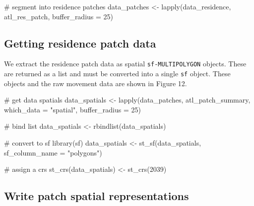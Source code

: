 \documentclass[]{scrreprt}
\newenvironment{Shaded}{}{}
\newcommand{\CommentTok}[1]{\textcolor[rgb]{0.00,0.50,0.00}{#1}}
\newcommand{\DataTypeTok}[1]{#1}
\newcommand{\DecValTok}[1]{#1}
\newcommand{\KeywordTok}[1]{\textcolor[rgb]{0.00,0.00,1.00}{#1}}
\newcommand{\NormalTok}[1]{#1}
\newcommand{\StringTok}[1]{\textcolor[rgb]{0.00,0.50,0.50}{#1}}
\begin{document}
\begin{Shaded}
\begin{Highlighting}[]
\CommentTok{# segment into residence patches}
\NormalTok{data_patches <-}\StringTok{ }\KeywordTok{lapply}\NormalTok{(data_residence, atl_res_patch,}
                       \DataTypeTok{buffer_radius =} \DecValTok{25}\NormalTok{)}
\end{Highlighting}
\end{Shaded}

\hypertarget{getting-residence-patch-data}{%
\subsection{Getting residence patch data}\label{getting-residence-patch-data}}

We extract the residence patch data as spatial \texttt{sf-MULTIPOLYGON} objects.
These are returned as a list and must be converted into a single \texttt{sf} object.
These objects and the raw movement data are shown in Figure 12.

\begin{Shaded}
\begin{Highlighting}[]
\CommentTok{# get data spatials}
\NormalTok{data_spatials <-}\StringTok{ }\KeywordTok{lapply}\NormalTok{(data_patches, atl_patch_summary,}
                        \DataTypeTok{which_data =} \StringTok{"spatial"}\NormalTok{,}
                        \DataTypeTok{buffer_radius =} \DecValTok{25}\NormalTok{)}

\CommentTok{# bind list}
\NormalTok{data_spatials <-}\StringTok{ }\KeywordTok{rbindlist}\NormalTok{(data_spatials)}

\CommentTok{# convert to sf}
\KeywordTok{library}\NormalTok{(sf)}
\NormalTok{data_spatials <-}\StringTok{ }\KeywordTok{st_sf}\NormalTok{(data_spatials, }\DataTypeTok{sf_column_name =} \StringTok{"polygons"}\NormalTok{)}

\CommentTok{# assign a crs}
\KeywordTok{st_crs}\NormalTok{(data_spatials) <-}\StringTok{ }\KeywordTok{st_crs}\NormalTok{(}\DecValTok{2039}\NormalTok{)}
\end{Highlighting}
\end{Shaded}

\hypertarget{write-patch-spatial-representations}{%
\subsection{Write patch spatial representations}\label{write-patch-spatial-representations}}
\end{document}
